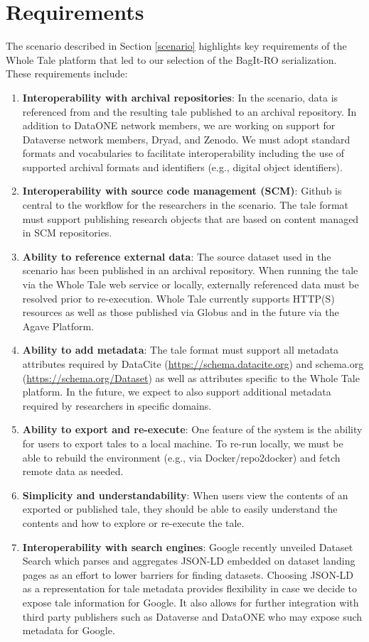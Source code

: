 \documentclass[conference]{IEEEtran}
\begin{document}
\section{Requirements}  \label{requirements}
The scenario described in Section \ref{scenario} highlights key requirements of the 
Whole Tale platform that led to our selection of the BagIt-RO serialization.  These requirements include:

\begin{enumerate}
\item{{\bf Interoperability with archival repositories}: In the
    scenario, data is referenced from and the resulting tale published
    to an archival repository. In addition to DataONE network members,
    we are working on support for Dataverse network members, Dryad, and
    Zenodo. We must adopt standard formats and vocabularies to
    facilitate interoperability including the use of supported
    archival formats and identifiers (e.g., digital object
		identifiers).} 
\item{{\bf Interoperability with source code management (SCM)}:  Github is central to the workflow for the researchers in the scenario. The tale format must support publishing research objects that are based on content managed in SCM repositories.}
\item{{\bf Ability to reference external data}: The source dataset used in the scenario has been published in an archival repository. When running the tale via the Whole Tale web service or locally, externally referenced data must be resolved prior to re-execution. Whole Tale currently supports HTTP(S) resources as well as those published via Globus and in the future via the Agave Platform.}
\item{{\bf Ability to add metadata}: The tale format must support all
	metadata attributes required by DataCite
		(\url{https://schema.datacite.org}) and schema.org (\url{https://schema.org/Dataset}) as well as
    attributes specific to the Whole Tale platform. 
 In the future, we expect to also support additional metadata required by researchers in specific domains.}
\item{{\bf Ability to export and re-execute}: One feature of the system is the ability for users to export tales to a local machine. To re-run locally, we must be able to rebuild the environment (e.g., via Docker/repo2docker) and fetch remote data as needed.}
\item{{\bf Simplicity and understandability}: When users view the contents of an exported or published tale, they should be able to easily understand the contents and how to explore or re-execute the tale.}
\item{{\bf Interoperability with search engines}: Google recently unveiled Dataset Search which parses and aggregates JSON-LD embedded on dataset landing pages as an effort to lower barriers for finding datasets. Choosing JSON-LD as a representation for tale metadata provides flexibility in case we decide to expose tale information for Google. It also allows for further integration with third party publishers such as Dataverse and DataONE who may expose such metadata for Google.}
\end{enumerate}
\end{document}
